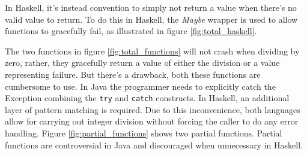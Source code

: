 \begin{figure}
\end{figure}


In Haskell, it's instead convention to simply not return a value when there's
no valid value to return. To do this in Haskell, the \emph{Maybe} wrapper is
used to allow functions to gracefully fail, as illustrated in figure
\ref{fig:total_haskell}.

The two functions in figure \ref{fig:total_functions} will not crash when dividing
by zero, rather, they gracefully return a value of either the division or a
value representing failure. But there's a drawback, both these functions are
cumbersome to use. In Java the programmer needs to explicitly catch the
Exception combining the \texttt{try} and \texttt{catch} constructs.
\cite{oracle_java_doc_compile_time_checking_of_exceptions}
\cite{oracle_java_doc_catch} In Haskell, an additional layer of pattern
matching is required. Due to this inconvenience, both languages allow
for carrying out integer division without forcing the caller to do any
error handling. Figure \ref{fig:partial_functions} shows two partial
functions. Partial functions are controversial in Java
\cite{oracle_java_doc_controversy} and discouraged when unnecessary in
Haskell. \cite{haskellwiki_avoiding_partial_functions}

